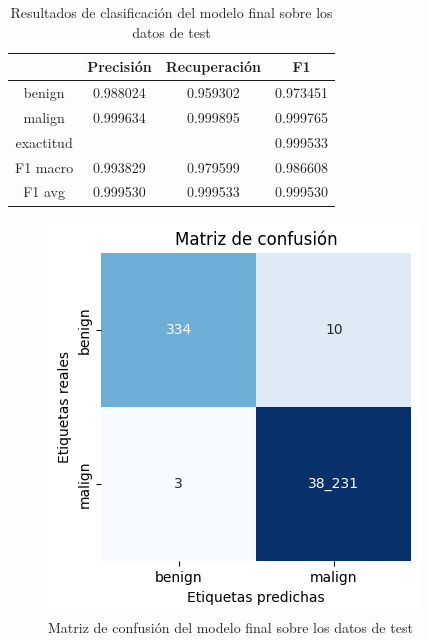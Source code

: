 \documentclass[10pt,a4paper,twoside]{article}
\begin{document}
\begin{multicols*}{2}
    \begin{table}[H]
        \begin{center}
            \begin{tabular}{|c | c c c |} 
                \hline
                & \textbf{Precisión} & \textbf{Recuperación} & \textbf{F1}\\
                \hline
                benign               & 0.988024 & 0.959302 & 0.973451 \\
                malign               & 0.999634 & 0.999895 & 0.999765  \\
                \hline
                exactitud            &          &          & 0.999533 \\
                F1 macro             & 0.993829 & 0.979599 & 0.986608 \\
                F1 avg               & 0.999530 & 0.999533 & 0.999530 \\
                \hline
            \end{tabular}
        \end{center}
        \caption{Resultados de clasificación del modelo final sobre los datos de test}
        \label{table:selectedresults}
    \end{table}
    
    \begin{figure}[H]
        \begin{center}
            \includegraphics[width=\linewidth]{../report/media/packet_pincer_train_model_random_forest_selected.png}
        \end{center}
        \caption{Matriz de confusión del modelo final sobre los datos de test}\label{fig:selectedmatrix}
    \end{figure}
    

\end{multicols*}
\end{document}
